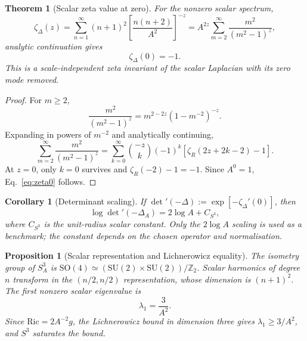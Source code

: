 \documentclass[
  aps,
  prd,
  reprint,
  superscriptaddress,
  nofootinbib,
  floatfix,
  longbibliography
]{revtex4-2}
\newtheorem{proposition}{Proposition}
\newtheorem{theorem}{Theorem}
\newtheorem{corollary}{Corollary}
\begin{document}
\begin{theorem}[Scalar zeta value at zero]
\label{thm:zeta0}
For the nonzero scalar spectrum,
\begin{equation}
  \zeta_\Delta(z)=
  \sum_{n=1}^{\infty}(n+1)^2\left[\frac{n(n+2)}{A^2}\right]^{-z}
  =A^{2z}\sum_{m=2}^{\infty}\frac{m^2}{(m^2-1)^z},
  \label{eq:zeta}
\end{equation}
analytic continuation gives
\begin{equation}
  \zeta_\Delta(0)=-1 .
  \label{eq:zeta0}
\end{equation}
This is a scale-independent zeta invariant of the scalar Laplacian with its zero
mode removed.
\end{theorem}

\begin{proof}
For \(m\ge2\),
\[
  \frac{m^2}{(m^2-1)^z}=m^{2-2z}(1-m^{-2})^{-z}.
\]
Expanding in powers of \(m^{-2}\) and analytically continuing,
\[
  \sum_{m=2}^\infty \frac{m^2}{(m^2-1)^z}
  =
  \sum_{k=0}^\infty
  \binom{-z}{k}(-1)^k
  \left[\zeta_R(2z+2k-2)-1\right].
\]
At \(z=0\), only \(k=0\) survives and
\(\zeta_R(-2)-1=-1\).  Since \(A^0=1\), Eq.~\eqref{eq:zeta0} follows.
\end{proof}

\begin{corollary}[Determinant scaling]
\label{cor:det}
If \(\det'(-\Delta):=\exp[-\zeta_\Delta'(0)]\), then
\begin{equation}
  \log\det'(-\Delta_A)=2\log A+C_{S^3},
  \label{eq:det}
\end{equation}
where \(C_{S^3}\) is the unit-radius scalar constant.  Only the \(2\log A\)
scaling is used as a benchmark; the constant depends on the chosen operator and
normalisation.
\end{corollary}

\begin{proposition}[Scalar representation and Lichnerowicz equality]
\label{prop:SO4}
The isometry group of \(S_A^3\) is
\(\mathrm{SO}(4)\simeq(\mathrm{SU}(2)\times\mathrm{SU}(2))/\mathbb Z_2\).
Scalar harmonics of degree \(n\) transform in the \((n/2,n/2)\) representation,
whose dimension is \((n+1)^2\).  The first nonzero scalar eigenvalue is
\begin{equation}
  \lambda_1=\frac{3}{A^2}.
\end{equation}
Since \(\mathrm{Ric}=2A^{-2}g\), the Lichnerowicz bound in dimension three gives
\(\lambda_1\ge3/A^2\), and \(S^3\) saturates the bound.
\end{proposition}
\end{document}
